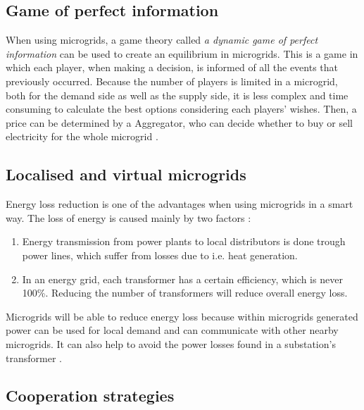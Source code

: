 \subsection{Game of perfect information}
When using microgrids, a game theory called \emph{a dynamic game of perfect information} can be used to create an equilibrium in microgrids. This is a game in which each player, when making a decision, is informed of all the events that previously occurred\cite{CourseInGameTheory}. Because the number of players is limited in a microgrid, both for the demand side as well as the supply side, it is less complex and time consuming to calculate the best options considering each players' wishes. Then, a price can be determined by a Aggregator, who can decide whether to buy or sell electricity for the whole microgrid \cite{MicrogridModellingPetrosAristidou}.

\subsection{Localised and virtual microgrids}
Energy loss reduction is one of the advantages when using microgrids in a smart way. The loss of energy is caused mainly by two factors \cite{EnergyLossURL}: 

\begin{enumerate}
\item Energy transmission from power plants to local distributors is done trough power lines, which suffer from losses due to i.e. heat generation.
\item In an energy grid, each transformer has a certain efficiency, which is never 100\%. Reducing the number of transformers will reduce overall energy loss.
\end{enumerate}

Microgrids will be able to reduce energy loss because within microgrids generated power can be used for local demand and can communicate with other nearby microgrids. It can also help to avoid the power losses found in a substation's transformer \cite{keypaper}.

\subsection{Cooperation strategies}



